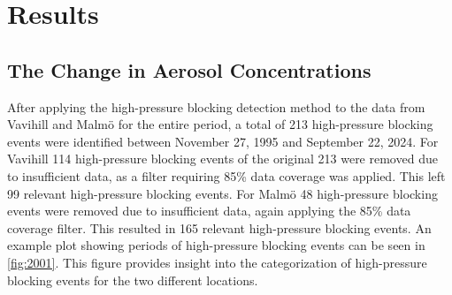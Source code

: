 \newpage
\section{Results}
\subsection{The Change in Aerosol Concentrations}
After applying the high-pressure blocking detection method to the data from Vavihill and Malmö for the entire period, a total of 213 high-pressure blocking events were identified between November 27, 1995 and September 22, 2024. For Vavihill 114 high-pressure blocking events of the original 213 were removed due to insufficient \PM data, as a filter requiring 85\% data coverage was applied. This left 99 relevant high-pressure blocking events. For Malmö 48 high-pressure blocking events were removed due to insufficient \PM data, again applying the 85\% data coverage filter. This resulted in 165 relevant high-pressure blocking events. An example plot showing periods of high-pressure blocking events can be seen in \autoref{fig:2001}. This figure provides insight into the categorization of high-pressure blocking events for the two different locations.  

